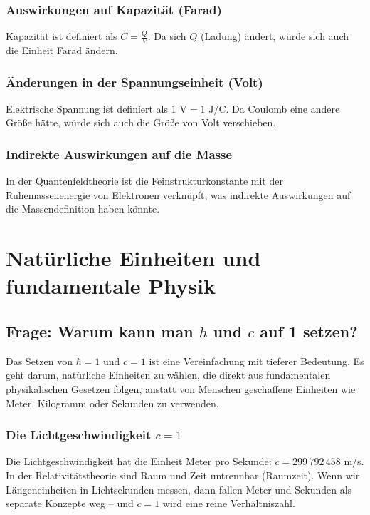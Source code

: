\documentclass[12pt,a4paper]{article}
\begin{document}
	\subsubsection{Auswirkungen auf Kapazität (Farad)}
	Kapazität ist definiert als $C = \frac{Q}{V}$. Da sich $Q$ (Ladung) ändert, würde sich auch die Einheit Farad ändern.
	
	\subsubsection{Änderungen in der Spannungseinheit (Volt)}
	Elektrische Spannung ist definiert als $1 \text{ V} = 1 \text{ J}/\text{C}$. Da Coulomb eine andere Größe hätte, würde sich auch die Größe von Volt verschieben.
	
	\subsubsection{Indirekte Auswirkungen auf die Masse}
	In der Quantenfeldtheorie ist die Feinstrukturkonstante mit der Ruhemassenenergie von Elektronen verknüpft, was indirekte Auswirkungen auf die Massendefinition haben könnte.
	
	\section{Natürliche Einheiten und fundamentale Physik}
	
	\subsection{Frage: Warum kann man $h$ und $c$ auf 1 setzen?}
	
	Das Setzen von $\hbar = 1$ und $c = 1$ ist eine Vereinfachung mit tieferer Bedeutung. Es geht darum, natürliche Einheiten zu wählen, die direkt aus fundamentalen physikalischen Gesetzen folgen, anstatt von Menschen geschaffene Einheiten wie Meter, Kilogramm oder Sekunden zu verwenden.
	
	\subsubsection{Die Lichtgeschwindigkeit $c = 1$}
	Die Lichtgeschwindigkeit hat die Einheit Meter pro Sekunde: $c = 299\,792\,458$ m/s. In der Relativitätstheorie \cite{Einstein1905} sind Raum und Zeit untrennbar (Raumzeit). Wenn wir Längeneinheiten in Lichtsekunden messen, dann fallen Meter und Sekunden als separate Konzepte weg – und $c = 1$ wird eine reine Verhältniszahl.
	
\end{document}
